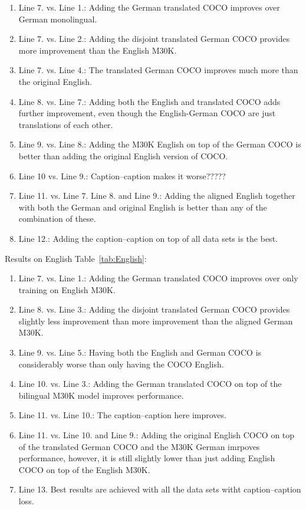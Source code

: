 \begin{enumerate}
    \item Line 7. vs. Line 1.: Adding the German translated COCO improves over 
    German monolingual.
    \item Line 7. vs. Line 2.: Adding the disjoint translated German COCO 
    provides more improvement than the English M30K.
    \item Line 7. vs. Line 4.: The translated German COCO improves much more than
    the original English.
    \item Line 8. vs. Line 7.: Adding both the English and translated COCO adds
    further improvement, even though the English-German COCO are just translations
    of each other.
    \item Line 9. vs. Line 8.: Adding the M30K English on top of the German COCO is
    better than adding the original English version of COCO.
    \item Line 10 vs. Line 9.:  Caption--caption makes it worse?????
    \item Line 11. vs. Line 7. Line 8. and Line 9.: Adding the aligned English 
    together with both the German and original English is better than any of
    the combination of these.
    \item Line 12.: Adding the caption--caption on top of all data sets is the best.
\end{enumerate}


Results on English Table~\ref{tab:English}:

\begin{enumerate}
    \item Line 7. vs. Line 1.: Adding the German translated COCO improves over 
    only training on English M30K.
    \item Line 8. vs. Line 3.: Adding the disjoint translated German COCO 
    provides slightly less improvement than more improvement than 
    the aligned German M30K.
    \item Line 9. vs. Line 5.: Having both the English and German COCO is 
    considerably worse than only having the COCO English.
    \item Line 10. vs. Line 3.: Adding the German translated COCO on top of the
    bilingual M30K model improves performance.
    \item Line 11. vs. Line 10.: The caption--caption here improves.
    \item Line 11. vs. Line 10. and Line 9.: Adding the original English COCO
    on top of the translated German COCO and the M30K German imrpoves performance,
    however, it is still slightly lower than just adding English COCO on top of
    the English M30K.
    \item Line 13. Best results are achieved with all the data sets witht 
    caption--caption loss. 
\end{enumerate}

